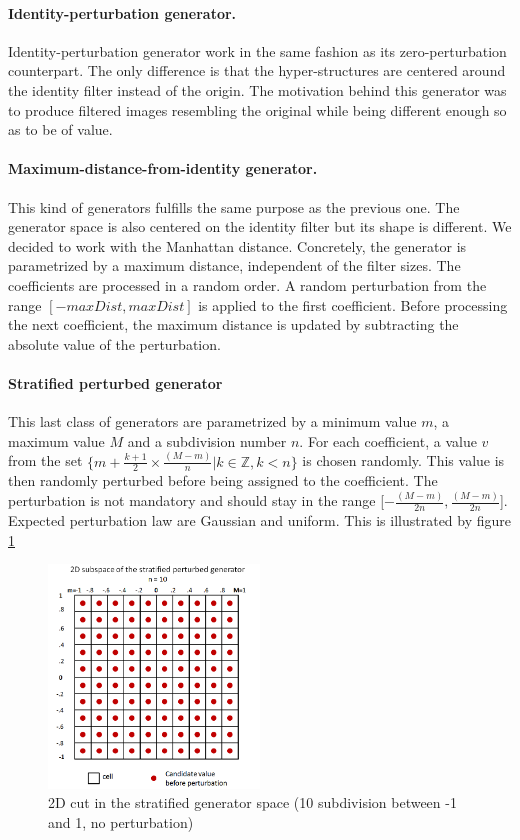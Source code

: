 \documentclass[a4paper]{report}
\begin{document}
			\paragraph{Identity-perturbation generator.}
			Identity-perturbation generator work in the same fashion as its zero-perturbation counterpart. The only difference is that the hyper-structures are centered around the identity filter instead of the origin. 
			The motivation behind this generator was to produce filtered images resembling the original while being different enough so as to be of value.
			\paragraph{Maximum-distance-from-identity generator.} 
			This kind of generators fulfills the same purpose as the previous one. The generator space is also centered on the identity filter but its shape is different. We decided to work with the Manhattan distance. Concretely, the generator is parametrized by a maximum distance, independent of the filter sizes. The coefficients are processed in a random order. A random perturbation from the range $[-maxDist, maxDist]$ is applied to the first coefficient. Before processing the next coefficient, the maximum distance is updated by subtracting the absolute value of the perturbation.
			\paragraph{Stratified perturbed generator}
			This last class of generators are parametrized by a minimum value $m$, a maximum value $M$ and a subdivision number $n$. For each coefficient, a value $v$ from the set $\{m + \frac{k+1}{2} \times \frac{(M-m)}{n} | k \in \mathbb{Z}, k < n\}$ is chosen randomly.  This value is then randomly perturbed before being assigned to the coefficient. The perturbation is not mandatory and should stay in the range [$-\frac{(M-m)}{2n}, \frac{(M-m)}{2n}$]. Expected perturbation law are Gaussian and uniform. This is illustrated by figure \ref{fig:stratgen}
			\begin{figure}
				\centering
					\includegraphics[width=0.5\textwidth]{images/stratgen.png}
				\caption{\label{fig:stratgen}2D cut in the stratified generator space (10 subdivision between -1 and 1, no perturbation)}
			\end{figure}
			
\end{document}
